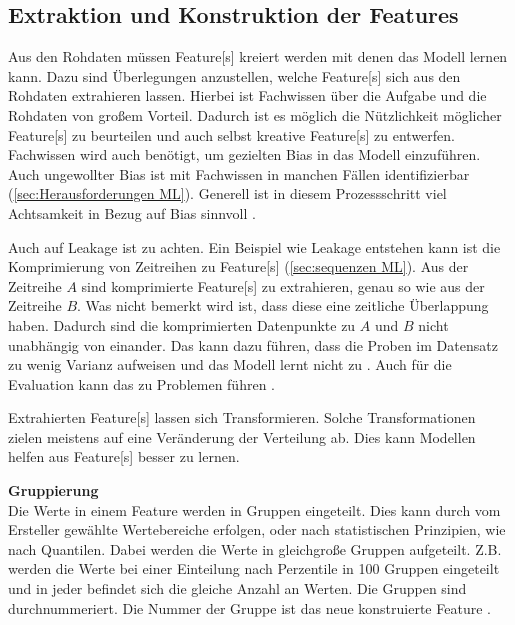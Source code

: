 \subsection{Extraktion und Konstruktion der Features} \label{sec:ML FeatExtr}
Aus den Rohdaten müssen \gls{Feature}[s] kreiert werden mit denen das Modell lernen kann. Dazu sind Überlegungen anzustellen, welche \gls{Feature}[s] sich aus den Rohdaten extrahieren lassen. Hierbei ist Fachwissen über die Aufgabe und die Rohdaten von großem Vorteil. Dadurch ist es möglich die Nützlichkeit möglicher \gls{Feature}[s] zu beurteilen und auch selbst kreative \gls{Feature}[s] zu entwerfen. Fachwissen wird auch benötigt, um gezielten \gls{Bias} in das Modell einzuführen. Auch ungewollter \gls{Bias} ist mit Fachwissen in manchen Fällen identifizierbar (\ref{sec:Herausforderungen ML}). Generell ist in diesem Prozessschritt viel Achtsamkeit in Bezug auf \gls{Bias} sinnvoll \cite{Zheng.2018, Geron.2019}. \par

Auch auf \gls{Leakage} ist zu achten. Ein Beispiel wie \gls{Leakage} entstehen kann ist die Komprimierung von Zeitreihen zu \gls{Feature}[s] (\ref{sec:sequenzen ML}). Aus der Zeitreihe \(A\) sind komprimierte  \gls{Feature}[s] zu extrahieren, genau so wie aus der Zeitreihe \(B\). Was nicht bemerkt wird ist, dass diese eine zeitliche Überlappung haben. Dadurch sind die komprimierten Datenpunkte zu \(A\) und \(B\) nicht unabhängig von einander. Das kann dazu führen, dass die Proben im Datensatz zu wenig Varianz aufweisen und das Modell lernt nicht zu . Auch für die Evaluation kann das zu Problemen führen \cite{Zheng.2018, Geron.2019}. \par

Extrahierten \gls{Feature}[s] lassen sich Transformieren. Solche Transformationen zielen meistens auf eine Veränderung der Verteilung ab. Dies kann Modellen helfen aus \gls{Feature}[s] besser zu lernen. \dubpar

\textbf{Gruppierung}\\
Die Werte in einem \gls{Feature} werden in Gruppen eingeteilt. Dies kann durch vom Ersteller gewählte Wertebereiche erfolgen, oder nach statistischen Prinzipien, wie nach Quantilen. Dabei werden die Werte in gleichgroße Gruppen aufgeteilt. Z.B. werden die Werte bei einer Einteilung nach Perzentile in 100 Gruppen eingeteilt und in jeder befindet sich die gleiche Anzahl an Werten. Die Gruppen sind durchnummeriert. Die Nummer der Gruppe ist das neue konstruierte \gls{Feature} \cite{Zheng.2018}. \dubpar

